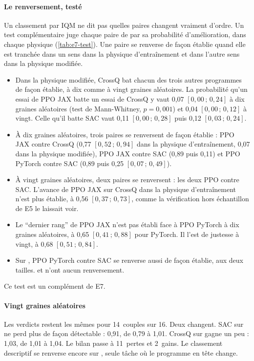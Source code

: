 \paragraph{Le renversement, testé}
Un classement par IQM ne dit pas quelles paires changent vraiment d'ordre. Un test complémentaire
juge chaque paire de  par sa probabilité d'amélioration, dans chaque physique
(\cref{tab:e7-test}). Une paire se renverse de façon établie quand elle est tranchée dans un sens dans la
physique d'entraînement et dans l'autre sens dans la physique modifiée.
\begin{itemize}
  \item Dans la physique modifiée, CrossQ bat chacun des trois autres programmes de façon établie, à dix comme
    à vingt graines aléatoires. La probabilité qu'un essai de PPO JAX batte un essai de CrossQ y vaut 0,07
    $[0{,}00\,;\,0{,}24]$ à dix graines aléatoires (test de Mann-Whitney, $p = 0{,}001$) et 0,04
    $[0{,}00\,;\,0{,}12]$ à vingt. Celle qu'il batte SAC vaut 0,11 $[0{,}00\,;\,0{,}28]$ puis 0,12
    $[0{,}03\,;\,0{,}24]$.
  \item À dix graines aléatoires, trois paires se renversent de façon établie : PPO JAX contre CrossQ (0,77
    $[0{,}52\,;\,0{,}94]$ dans la physique d'entraînement, 0,07 dans la physique modifiée), PPO JAX contre SAC
    (0,89 puis 0,11) et PPO PyTorch contre SAC (0,89 puis 0,25 $[0{,}07\,;\,0{,}49]$).
  \item À vingt graines aléatoires, deux paires se renversent : les deux PPO contre SAC. L'avance de PPO JAX
    sur CrossQ dans la physique d'entraînement n'est plus établie, à 0,56 $[0{,}37\,;\,0{,}73]$, comme la
    vérification hors échantillon de E5 le laissait voir.
  \item Le \enquote{dernier rang} de PPO JAX n'est pas établi face à PPO PyTorch à dix graines aléatoires, à
    0,65 $[0{,}41\,;\,0{,}88]$ pour PyTorch. Il l'est de justesse à vingt, à 0,68 $[0{,}51\,;\,0{,}84]$.
  \item Sur , PPO PyTorch contre SAC se renverse aussi de façon établie, aux deux tailles.
     et  n'ont aucun renversement.
\end{itemize}
Ce test est un complément de E7.


\paragraph{Vingt graines aléatoires}
Les verdicts restent les mêmes pour 14~couples sur 16. Deux changent. SAC sur  ne perd plus de
façon détectable : 0,91, de 0,79 à 1,01. CrossQ sur  gagne un peu : 1,03, de 1,01 à 1,04. Le
bilan passe à 11~pertes et 2~gains. Le classement descriptif se renverse encore sur , seule tâche
où le programme en tête change.

